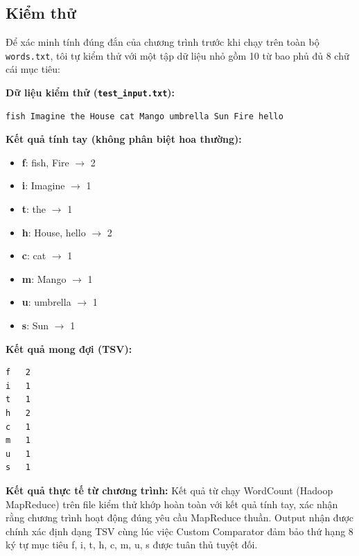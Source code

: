 \subsection{Kiểm thử}

Để xác minh tính đúng đắn của chương trình trước khi chạy trên toàn bộ
\texttt{words.txt}, tôi tự kiểm thử với một tập dữ liệu nhỏ gồm 10 từ bao phủ
đủ 8 chữ cái mục tiêu:

\textbf{Dữ liệu kiểm thử (\texttt{test\_input.txt}):}
\begin{verbatim}
fish Imagine the House cat Mango umbrella Sun Fire hello
\end{verbatim}

\textbf{Kết quả tính tay (không phân biệt hoa thường):}
\begin{itemize}
  \item \textbf{f}: fish, Fire $\rightarrow$ 2
  \item \textbf{i}: Imagine $\rightarrow$ 1
  \item \textbf{t}: the $\rightarrow$ 1
  \item \textbf{h}: House, hello $\rightarrow$ 2
  \item \textbf{c}: cat $\rightarrow$ 1
  \item \textbf{m}: Mango $\rightarrow$ 1
  \item \textbf{u}: umbrella $\rightarrow$ 1
  \item \textbf{s}: Sun $\rightarrow$ 1
\end{itemize}

\textbf{Kết quả mong đợi (TSV):}
\begin{verbatim}
f	2
i	1
t	1
h	2
c	1
m	1
u	1
s	1
\end{verbatim}

\textbf{Kết quả thực tế từ chương trình:} Kết quả từ chạy WordCount (Hadoop MapReduce) trên file kiểm
thử khớp hoàn toàn với kết quả tính tay, xác nhận rằng chương trình hoạt động đúng
yêu cầu MapReduce thuần. Output nhận được chính xác định dạng TSV cùng lúc việc Custom Comparator đảm bảo thứ hạng 8 ký tự mục tiêu f, i, t, h, c, m, u, s được tuân thủ tuyệt đối.
